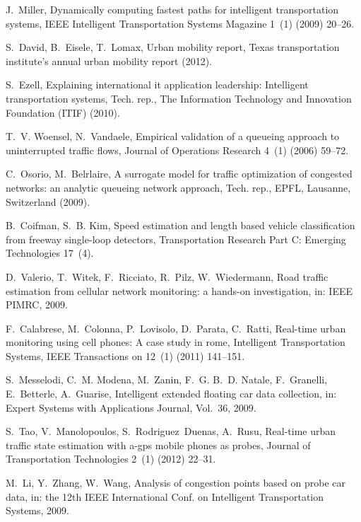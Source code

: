 \documentclass[10pt,onecolumn]{article}
\begin{document}

\begin{thebibliography}{00}

J.~Miller, Dynamically computing fastest paths for intelligent transportation
  systems, IEEE Intelligent Transportation Systems Magazine 1~(1) (2009)
  20--26.

S.~David, B.~Eisele, T.~Lomax, Urban mobility report, Texas transportation
  institute's annual urban mobility report (2012).

S.~Ezell, Explaining international it application leadership: Intelligent
  transportation systems, Tech. rep., The Information Technology and Innovation
  Foundation (ITIF) (2010).

T.~V. Woensel, N.~Vandaele, Empirical validation of a queueing approach to
  uninterrupted traffic flows, Journal of Operations Research 4~(1) (2006)
  59--72.

C.~Osorio, M.~Belrlaire, A surrogate model for traffic optimization of
  congested networks: an analytic queueing network approach, Tech. rep., EPFL,
  Lausanne, Switzerland (2009).

B.~Coifman, S.~B. Kim, Speed estimation and length based vehicle classification
  from freeway single-loop detectors, Transportation Research Part C: Emerging
  Technologies 17~(4).

D.~Valerio, T.~Witek, F.~Ricciato, R.~Pilz, W.~Wiedermann, Road traffic
  estimation from cellular network monitoring: a hands-on investigation, in:
  IEEE PIMRC, 2009.

F.~Calabrese, M.~Colonna, P.~Lovisolo, D.~Parata, C.~Ratti, Real-time urban
  monitoring using cell phones: A case study in rome, Intelligent
  Transportation Systems, IEEE Transactions on 12~(1) (2011) 141--151.

S.~Messelodi, C.~M. Modena, M.~Zanin, F.~G. B.~D. Natale, F.~Granelli,
  E.~Betterle, A.~Guarise, Intelligent extended floating car data collection,
  in: Expert Systems with Applications Journal, Vol.~36, 2009.

S.~Tao, V.~Manolopoulos, S.~Rodriguez~Duenas, A.~Rusu, Real-time urban traffic
  state estimation with a-gps mobile phones as probes, Journal of
  Transportation Technologies 2~(1) (2012) 22--31.

M.~Li, Y.~Zhang, W.~Wang, Analysis of congestion points based on probe car
  data, in: the 12th IEEE International Conf. on Intelligent Transportation
  Systems, 2009.


\end{thebibliography}
\end{document}
